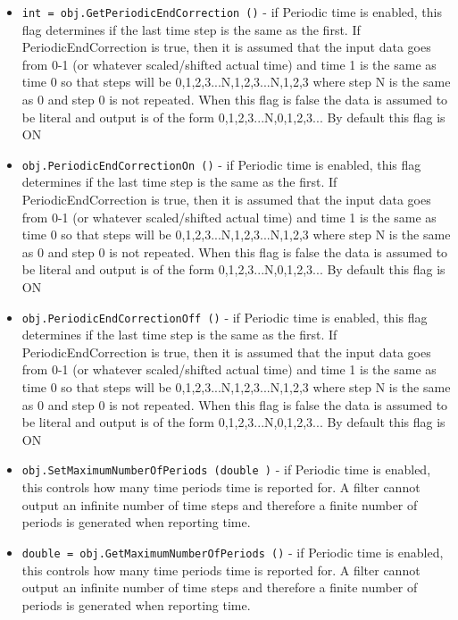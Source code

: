 \begin{itemize}
\item  \verb|int = obj.GetPeriodicEndCorrection ()| -  if Periodic time is enabled, this flag determines if the last time step is the same
 as the first. If PeriodicEndCorrection is true, then it is assumed that the input
 data goes from 0-1 (or whatever scaled/shifted actual time) and time 1 is the
 same as time 0 so that steps will be 0,1,2,3...N,1,2,3...N,1,2,3 where step N
 is the same as 0 and step 0 is not repeated. When this flag is false
 the data is assumed to be literal and output is of the form 0,1,2,3...N,0,1,2,3...
 By default this flag is ON

\item  \verb|obj.PeriodicEndCorrectionOn ()| -  if Periodic time is enabled, this flag determines if the last time step is the same
 as the first. If PeriodicEndCorrection is true, then it is assumed that the input
 data goes from 0-1 (or whatever scaled/shifted actual time) and time 1 is the
 same as time 0 so that steps will be 0,1,2,3...N,1,2,3...N,1,2,3 where step N
 is the same as 0 and step 0 is not repeated. When this flag is false
 the data is assumed to be literal and output is of the form 0,1,2,3...N,0,1,2,3...
 By default this flag is ON

\item  \verb|obj.PeriodicEndCorrectionOff ()| -  if Periodic time is enabled, this flag determines if the last time step is the same
 as the first. If PeriodicEndCorrection is true, then it is assumed that the input
 data goes from 0-1 (or whatever scaled/shifted actual time) and time 1 is the
 same as time 0 so that steps will be 0,1,2,3...N,1,2,3...N,1,2,3 where step N
 is the same as 0 and step 0 is not repeated. When this flag is false
 the data is assumed to be literal and output is of the form 0,1,2,3...N,0,1,2,3...
 By default this flag is ON

\item  \verb|obj.SetMaximumNumberOfPeriods (double )| -  if Periodic time is enabled, this controls how many time periods time is reported 
 for. A filter cannot output an infinite number of time steps and therefore a finite
 number of periods is generated when reporting time.

\item  \verb|double = obj.GetMaximumNumberOfPeriods ()| -  if Periodic time is enabled, this controls how many time periods time is reported 
 for. A filter cannot output an infinite number of time steps and therefore a finite
 number of periods is generated when reporting time.

\end{itemize}
